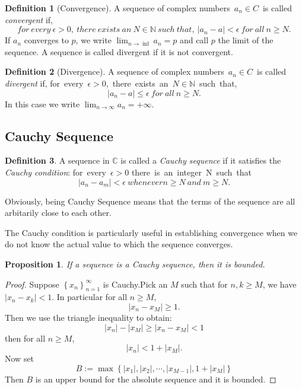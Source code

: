 \documentclass{article}
\newtheorem{prop}[theorem]{Proposition}
\theoremstyle{definition}
\newtheorem{defi}{Definition}[section]
\begin{document}
\begin{defi}[Convergence]
A sequence of complex numbers\ $a_{n}\in C$\ is called \textit{convergent} if,
$$for\ every\ \epsilon>0,\ there\ exists\ an\ N\in\mathbb{N}\ such\ that,\
|a_{n}-a|<\epsilon\ for\ all\ n\geq N.$$
If ${a_{n}}$ converges to $p$, we write $\lim_{n\rightarrow\inf}a_{n}=p$ and call
$p$ the limit of the sequence. A sequence is called divergent if it is not convergent.
\end{defi}


\begin{defi}[Divergence]
A sequence of complex numbers\ $a_{n}\in C$\ is called \textit{divergent} if,
for\ every\ $\epsilon>0$,\ there\ exists\ an\ $N\in\mathbb{N}$\ such\ that,
$$|a_{n}-a|\leq\epsilon\ for\ all\ n\geq N.$$
In this case we write $\lim_{n\rightarrow\infty}a_{n}=+\infty$.
\end{defi}

\subsection{Cauchy Sequence}

\begin{defi}
A sequence in $\mathbb{C}$ is called a \textit{Cauchy sequence} if it satisfies the 
\textit{Cauchy condition}:
for\ every\ $\epsilon>0$ there\ is\ an\ integer\ N\ such\ that\
$$|a_{n}-a_{m}|<\epsilon\ whenever n\geq N\ and\ m\geq N.$$
\end{defi}

Obviously, being Cauchy Sequence means that the terms 
of the sequence are all arbitarily close to each other.

The Cauchy condition is particularly useful in establishing 
convergence when we do not know the actual value to which 
the sequence converges.

\begin{prop}
If a sequence is a Cauchy sequence, then it is bounded.
\end{prop}

\begin{proof}
    Suppose $\left\{x_{n}\right\}_{n=1}^{\infty}$ is Cauchy.Pick an $M$ 
    such that for $n,k\geq M$, we have $|x_{n}-x_{k}|<1$. In particular 
    for all $n\geq M$, $$|x_{n}-x_{M}|\geq 1.$$
    Then we use the triangle inequality to obtain:
    $$|x_{n}|-|x_{M}|\geq |x_{n}-x_{M}| <1$$
    then for all $n\geq M$, $$|x_{n}|<1+|x_{M}|.$$
    Now set 
    $$B:=\max\left\{|x_{1}|,|x_{2}|,\cdots,|x_{M-1}|,1+|x_{M}|\right\}$$
    Then $B$ is an upper bound for the absolute sequence and it is bounded.
\end{proof}
\end{document}
